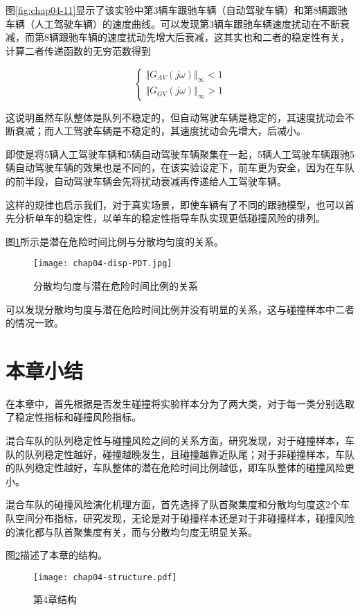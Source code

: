 图\ref{fig:chap04-11}显示了该实验中第3辆车跟驰车辆（自动驾驶车辆）和第8辆跟驰车辆（人工驾驶车辆）的速度曲线。可以发现第3辆车跟驰车辆速度扰动在不断衰减，而第8辆跟驰车辆的速度扰动先增大后衰减，这其实也和二者的稳定性有关，计算二者传递函数的无穷范数得到

\begin{equation}
    \begin{cases}
      \Vert G_{AV}(j\omega) \Vert_{\infty} < 1 \\
      \Vert G_{GV}(j\omega) \Vert_{\infty} > 1
    \end{cases}
    \label{eq:chap04-10}
\end{equation}

这说明虽然车队整体是队列不稳定的，但自动驾驶车辆是稳定的，其速度扰动会不断衰减；而人工驾驶车辆是不稳定的，其速度扰动会先增大，后减小。

即使是将5辆人工驾驶车辆和5辆自动驾驶车辆聚集在一起，5辆人工驾驶车辆跟驰5辆自动驾驶车辆的效果也是不同的，在该实验设定下，前车更为安全，因为在车队的前半段，自动驾驶车辆会先将扰动衰减再传递给人工驾驶车辆。

这样的规律也启示我们，对于真实场景，即使车辆有了不同的跟驰模型，也可以首先分析单车的稳定性，以单车的稳定性指导车队实现更低碰撞风险的排列。

图\ref{fig:chap04-12}所示是潜在危险时间比例与分散均匀度的关系。

\begin{figure}
    \centering
    \texttt{[image: chap04-disp-PDT.jpg]}
    \caption{分散均匀度与潜在危险时间比例的关系}
    \label{fig:chap04-12}
\end{figure} 

可以发现分散均匀度与潜在危险时间比例并没有明显的关系，这与碰撞样本中二者的情况一致。

\section{本章小结}

在本章中，首先根据是否发生碰撞将实验样本分为了两大类，对于每一类分别选取了稳定性指标和碰撞风险指标。

混合车队的队列稳定性与碰撞风险之间的关系方面，研究发现，对于碰撞样本，车队的队列稳定性越好，碰撞越晚发生，且碰撞越靠近队尾；对于非碰撞样本，车队的队列稳定性越好，车队整体的潜在危险时间比例越低，即车队整体的碰撞风险更小。

混合车队的碰撞风险演化机理方面，首先选择了队首聚集度和分散均匀度这2个车队空间分布指标，研究发现，无论是对于碰撞样本还是对于非碰撞样本，碰撞风险的演化都与队首聚集度有关，而与分散均匀度无明显关系。

图\ref{fig:chap04-strcture}描述了本章的结构。

\begin{figure}
    \centering
    \texttt{[image: chap04-structure.pdf]}
    \caption{第4章结构}
    \label{fig:chap04-strcture}
\end{figure} 

